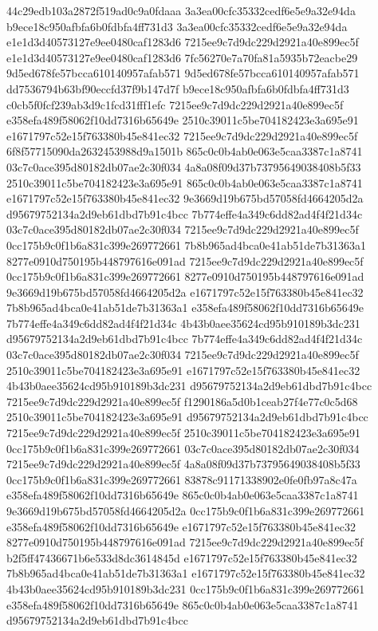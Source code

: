 44c29edb103a2872f519ad0c9a0fdaaa
3a3ea00cfc35332cedf6e5e9a32e94da
b9ece18c950afbfa6b0fdbfa4ff731d3
3a3ea00cfc35332cedf6e5e9a32e94da
e1e1d3d40573127e9ee0480caf1283d6
7215ee9c7d9dc229d2921a40e899ec5f
e1e1d3d40573127e9ee0480caf1283d6
7fc56270e7a70fa81a5935b72eacbe29
9d5ed678fe57bcca610140957afab571
9d5ed678fe57bcca610140957afab571
dd7536794b63bf90eccfd37f9b147d7f
b9ece18c950afbfa6b0fdbfa4ff731d3
c0cb5f0fcf239ab3d9c1fcd31fff1efc
7215ee9c7d9dc229d2921a40e899ec5f
e358efa489f58062f10dd7316b65649e
2510c39011c5be704182423e3a695e91
e1671797c52e15f763380b45e841ec32
7215ee9c7d9dc229d2921a40e899ec5f
6f8f57715090da2632453988d9a1501b
865c0c0b4ab0e063e5caa3387c1a8741
03c7c0ace395d80182db07ae2c30f034
4a8a08f09d37b73795649038408b5f33
2510c39011c5be704182423e3a695e91
865c0c0b4ab0e063e5caa3387c1a8741
e1671797c52e15f763380b45e841ec32
9e3669d19b675bd57058fd4664205d2a
d95679752134a2d9eb61dbd7b91c4bcc
7b774effe4a349c6dd82ad4f4f21d34c
03c7c0ace395d80182db07ae2c30f034
7215ee9c7d9dc229d2921a40e899ec5f
0cc175b9c0f1b6a831c399e269772661
7b8b965ad4bca0e41ab51de7b31363a1
8277e0910d750195b448797616e091ad
7215ee9c7d9dc229d2921a40e899ec5f
0cc175b9c0f1b6a831c399e269772661
8277e0910d750195b448797616e091ad
9e3669d19b675bd57058fd4664205d2a
e1671797c52e15f763380b45e841ec32
7b8b965ad4bca0e41ab51de7b31363a1
e358efa489f58062f10dd7316b65649e
7b774effe4a349c6dd82ad4f4f21d34c
4b43b0aee35624cd95b910189b3dc231
d95679752134a2d9eb61dbd7b91c4bcc
7b774effe4a349c6dd82ad4f4f21d34c
03c7c0ace395d80182db07ae2c30f034
7215ee9c7d9dc229d2921a40e899ec5f
2510c39011c5be704182423e3a695e91
e1671797c52e15f763380b45e841ec32
4b43b0aee35624cd95b910189b3dc231
d95679752134a2d9eb61dbd7b91c4bcc
7215ee9c7d9dc229d2921a40e899ec5f
f1290186a5d0b1ceab27f4e77c0c5d68
2510c39011c5be704182423e3a695e91
d95679752134a2d9eb61dbd7b91c4bcc
7215ee9c7d9dc229d2921a40e899ec5f
2510c39011c5be704182423e3a695e91
0cc175b9c0f1b6a831c399e269772661
03c7c0ace395d80182db07ae2c30f034
7215ee9c7d9dc229d2921a40e899ec5f
4a8a08f09d37b73795649038408b5f33
0cc175b9c0f1b6a831c399e269772661
83878c91171338902e0fe0fb97a8c47a
e358efa489f58062f10dd7316b65649e
865c0c0b4ab0e063e5caa3387c1a8741
9e3669d19b675bd57058fd4664205d2a
0cc175b9c0f1b6a831c399e269772661
e358efa489f58062f10dd7316b65649e
e1671797c52e15f763380b45e841ec32
8277e0910d750195b448797616e091ad
7215ee9c7d9dc229d2921a40e899ec5f
b2f5ff47436671b6e533d8dc3614845d
e1671797c52e15f763380b45e841ec32
7b8b965ad4bca0e41ab51de7b31363a1
e1671797c52e15f763380b45e841ec32
4b43b0aee35624cd95b910189b3dc231
0cc175b9c0f1b6a831c399e269772661
e358efa489f58062f10dd7316b65649e
865c0c0b4ab0e063e5caa3387c1a8741
d95679752134a2d9eb61dbd7b91c4bcc
